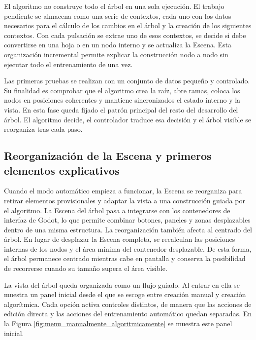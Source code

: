 El algoritmo no construye todo el árbol en una sola ejecución.
El trabajo pendiente se almacena como una serie de contextos, cada uno con los datos necesarios para el cálculo de los cambios en el árbol y la creación de los siguientes contextos. %
Con cada pulsación se extrae uno de esos contextos, se decide si debe convertirse en una hoja o en un \gls{nodo} interno y se actualiza la \gls{Escena}.
Esta organización incremental permite explicar la construcción \gls{nodo} a \gls{nodo} sin ejecutar todo el entrenamiento de una vez.

Las primeras pruebas se realizan con un conjunto de datos pequeño y controlado.
Su finalidad es comprobar que el algoritmo crea la raíz, abre ramas, coloca los \gls{nodo}s en posiciones coherentes y mantiene sincronizados el estado interno y la vista.
En esta fase queda fijado el patrón principal del resto del desarrollo del árbol.
El algoritmo decide, el controlador traduce esa decisión y el árbol visible se reorganiza tras cada paso.


\subsection[Reorganización de la Escena y primeros elementos explicativos]{Reorganización de la \protect\gls{Escena} y primeros elementos explicativos}

Cuando el modo automático empieza a funcionar, la \gls{Escena} se reorganiza para retirar elementos provisionales y adaptar la vista a una construcción guiada por el algoritmo.
La \gls{Escena} del árbol pasa a integrarse con los contenedores de interfaz de Godot, lo que permite combinar botones, paneles y zonas desplazables dentro de una misma estructura.
La reorganización también afecta al centrado del árbol.
En lugar de desplazar la \gls{Escena} completa, se recalculan las posiciones internas de los \gls{nodo}s y el área mínima del contenedor desplazable.
De esta forma, el árbol permanece centrado mientras cabe en pantalla y conserva la posibilidad de recorrerse cuando su tamaño supera el área visible.

La vista del árbol queda organizada como un flujo guiado.
Al entrar en ella se muestra un panel inicial desde el que se escoge entre creación manual y creación algorítmica.
Cada opción activa controles distintos, de manera que las acciones de edición directa y las acciones del entrenamiento automático quedan separadas.
En la Figura \ref{fig:menu_manualmente_algoritmicamente} se muestra este panel inicial.

